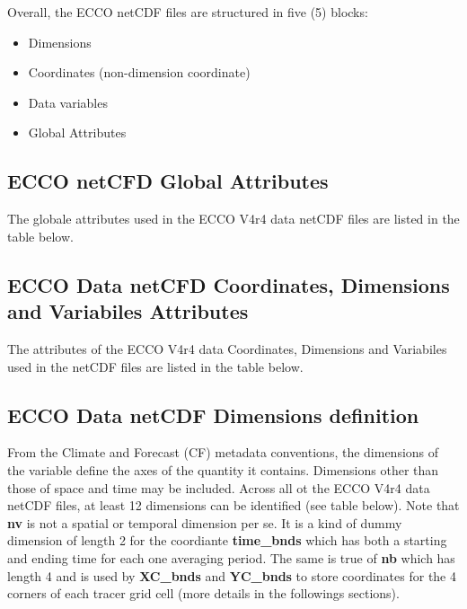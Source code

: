 \par \vspace{0.1in} Overall, the ECCO netCDF  files are structured in five (5) blocks: 
\begin{itemize}
    \item Dimensions
    \item Coordinates (non-dimension coordinate)
    \item Data variables
    \item Global Attributes
\end{itemize}

\subsection{ECCO netCFD Global Attributes}
\par The globale attributes used in the ECCO V4r4 data netCDF files are listed in the table below.



\subsection{ECCO Data netCFD Coordinates, Dimensions and Variabiles Attributes}
\par The attributes of the ECCO V4r4 data Coordinates, Dimensions and Variabiles used in the netCDF files are listed in the table below.




\subsection{ECCO Data netCDF Dimensions definition}
From the Climate and Forecast (CF) metadata conventions, the dimensions of the variable define the axes of the quantity it contains. Dimensions other than those of space and time may be included. Across all ot the ECCO V4r4 data netCDF files, at least 12 dimensions can be identified (see table below). Note that \textbf{nv} is not a spatial or temporal dimension per se. It is a kind of dummy dimension of length 2 for the coordiante \textbf{time\_bnds} which has both a starting and ending time for each one averaging period. The same is true of \textbf{nb} which has length 4 and is used by \textbf{XC\_bnds} and \textbf{YC\_bnds} to store coordinates for the 4 corners of each tracer grid cell (more details in the followings sections).

